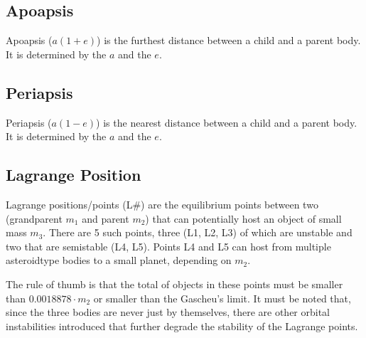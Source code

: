 \documentclass[letterpaper,10pt,english]{sphinxmanual}
\begin{document}
\subsection{Apoapsis}
\label{\detokenize{quantities/orbital/apoapsis:apoapsis}}\label{\detokenize{quantities/orbital/apoapsis::doc}}\label{\detokenize{quantities/orbital/apoapsis:id1}}
\sphinxAtStartPar
Apoapsis (\(a (1 + e)\)) is the furthest distance between a child and a parent body.
It is determined by the {\hyperref[\detokenize{quantities/orbital/semi_major_axis:id1}]{}} \(a\) and the
{\hyperref[\detokenize{quantities/orbital/eccentricity:id1}]{}} \(e\).


\subsection{Periapsis}
\label{\detokenize{quantities/orbital/periapsis:periapsis}}\label{\detokenize{quantities/orbital/periapsis::doc}}\label{\detokenize{quantities/orbital/periapsis:id1}}
\sphinxAtStartPar
Periapsis (\(a (1 - e)\)) is the nearest distance between a child and a parent body.
It is determined by the {\hyperref[\detokenize{quantities/orbital/semi_major_axis:id1}]{}} \(a\) and the
{\hyperref[\detokenize{quantities/orbital/eccentricity:id1}]{}} \(e\).


\subsection{Lagrange Position}
\label{\detokenize{quantities/orbital/lagrange_position:lagrange-position}}\label{\detokenize{quantities/orbital/lagrange_position::doc}}\label{\detokenize{quantities/orbital/lagrange_position:id1}}
\sphinxAtStartPar
Lagrange positions/points (L\#) are the equilibrium points between
two {\hyperref[\detokenize{quantities/material/mass:id1}]{}} (grandparent \(m_1\) and parent \(m_2\)) that can
potentially host an object of small mass \(m_3\). There are
5 such points, three (L1, L2, L3) of which are unstable and two that are semi\sphinxhyphen{}stable (L4, L5).
Points L4 and L5 can host from multiple asteroid\sphinxhyphen{}type bodies to a small planet, depending on \(m_2\).

\sphinxAtStartPar
The rule of thumb is that the total {\hyperref[\detokenize{quantities/material/mass:id1}]{}} of objects in these points
must be smaller than \(0.0018878 \cdot m_2\) or smaller than the Gascheu’s limit.
It must be noted that, since the three bodies are never just by themselves,
there are other orbital instabilities introduced that
further degrade the stability of the Lagrange points.
\end{document}

